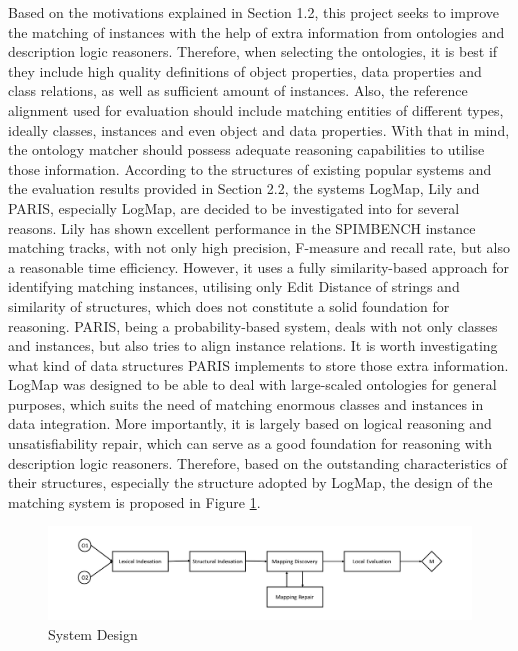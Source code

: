 Based on the motivations explained in Section 1.2, this project seeks to improve the matching of instances with the help of extra information from ontologies and description logic reasoners. Therefore, when selecting the ontologies, it is best if they include high quality definitions of object properties, data properties and class relations, as well as sufficient amount of instances. Also, the reference alignment used for evaluation should include matching entities of different types, ideally classes, instances and even object and data properties. With that in mind, the ontology matcher should possess adequate reasoning capabilities to utilise those information. According to the structures of existing popular systems and the evaluation results provided in Section 2.2, the systems LogMap, Lily and PARIS, especially LogMap, are decided to be investigated into for several reasons. Lily has shown excellent performance in the SPIMBENCH instance matching tracks, with not only high precision, F-measure and recall rate, but also a reasonable time efficiency. However, it uses a fully similarity-based approach for identifying matching instances, utilising only Edit Distance of strings and similarity of structures, which does not constitute a solid foundation for reasoning. PARIS, being a probability-based system, deals with not only classes and instances, but also tries to align instance relations. It is worth investigating what kind of data structures PARIS implements to store those extra information. LogMap was designed to be able to deal with large-scaled ontologies for general purposes, which suits the need of matching enormous classes and instances in data integration. More importantly, it is largely based on logical reasoning and unsatisfiability repair, which can serve as a good foundation for reasoning with description logic reasoners. Therefore, based on the outstanding characteristics of their structures, especially the structure adopted by LogMap, the design of the matching system is proposed in Figure \ref{fig:Structure}.

\begin{figure}[ht]
\begin{center}
\includegraphics[width=\textwidth]{img/Structure.pdf}
\caption{System Design}
\label{fig:Structure}
\end{center}
\end{figure}


